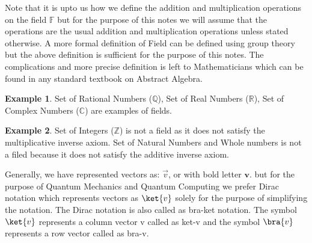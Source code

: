 \documentclass[12pt, oneside]{book}
\theoremstyle{definition}
\theoremstyle{definition}
\newtheorem{example}{Example}[section]
\theoremstyle{remark}
\begin{document}
Note that it is upto us how we define the addition and multiplication operations on the field $\mathbb{F}$ 
but for the purpose of this notes we will assume that the operations are the usual addition and multiplication operations unless stated otherwise.
A more formal definition of Field can be defined using group theory but the above definition is sufficient for the purpose of this notes.
The complications and more precise definition is left to Mathematicians which can be found in any standard textbook on Abstract Algebra.
\begin{example}
    Set of Rational Numbers ($\mathbb{Q}$), Set of Real Numbers ($\mathbb{R}$),
    Set of Complex Numbers ($\mathbb{C}$) are examples of fields.
\end{example}

\begin{example}
    Set of Integers ($\mathbb{Z}$) is not a field as it does not satisfy the multiplicative inverse axiom.
    Set of Natural Numbers and Whole numbers is not a filed because it does not satisfy the additive inverse axiom.
\end{example}

Generally, we have represented vectors as: $\vec{v}$, or with bold letter $\mathbf{v}$. but for the 
purpose of Quantum Mechanics and Quantum Computing we prefer Dirac notation which represents vectors as $\ket{v}$ 
solely for the purpose of simplifying the notation. The Dirac notation is also called as bra-ket notation. The 
symbol $\ket{v}$ represents a column vector v called as ket-v and the symbol $\bra{v}$ represents a 
row vector called as bra-v. 
\end{document}
